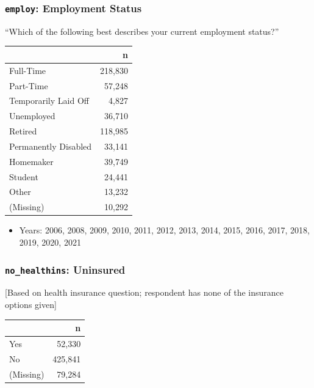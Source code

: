 \documentclass[10pt,article,oneside]{memoir}
\theoremstyle{definition}
\begin{document}
\hypertarget{employ-employment-status}{%
\subsubsection{\texorpdfstring{\texttt{employ}: Employment
Status}{employ: Employment Status}}\label{employ-employment-status}}

``Which of the following best describes your current employment
status?''

\begin{table}[H]
\centering
\begin{tabular}[t]{lr}
\toprule
 & n\\
\midrule
Full-Time & 218,830\\
Part-Time & 57,248\\
Temporarily Laid Off & 4,827\\
Unemployed & 36,710\\
Retired & 118,985\\
Permanently Disabled & 33,141\\
Homemaker & 39,749\\
Student & 24,441\\
Other & 13,232\\
(Missing) & 10,292\\
\bottomrule
\end{tabular}
\end{table}

\begin{itemize}
\tightlist
\item
  Years: 2006, 2008, 2009, 2010, 2011, 2012, 2013, 2014, 2015, 2016,
  2017, 2018, 2019, 2020, 2021
\end{itemize}

\hypertarget{no_healthins-uninsured}{%
\subsubsection{\texorpdfstring{\texttt{no\_healthins}:
Uninsured}{no\_healthins: Uninsured}}\label{no_healthins-uninsured}}

{[}Based on health insurance question; respondent has none of the
insurance options given{]}

\begin{table}[H]
\centering
\begin{tabular}[t]{lr}
\toprule
 & n\\
\midrule
Yes & 52,330\\
No & 425,841\\
(Missing) & 79,284\\
\bottomrule
\end{tabular}
\end{table}
\end{document}
